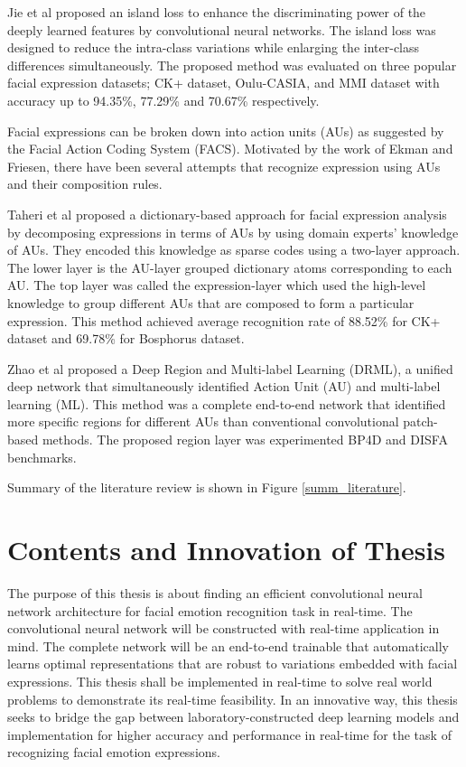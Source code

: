 \documentclass[master]{thesis-uestc}
\begin{document}
Jie et al\cite{8373844} proposed an island loss to enhance the discriminating power of the deeply learned features by convolutional neural networks. The island loss was designed to reduce the intra-class variations while enlarging the inter-class differences simultaneously. The proposed method was evaluated on three popular facial expression datasets; CK+ dataset, Oulu-CASIA, and MMI dataset with accuracy up to 94.35\%, 77.29\% and 70.67\% respectively.

Facial expressions can be broken down into action units (AUs) as suggested by the Facial Action Coding System (FACS). Motivated by the work of Ekman and Friesen\cite{ekman}, there have been several attempts that recognize expression using AUs and their composition rules.

Taheri et al\cite{6837526} proposed a dictionary-based approach for facial expression analysis by decomposing expressions in terms of AUs by using domain experts’ knowledge of AUs. They encoded this knowledge as sparse codes using a two-layer approach. The lower layer is the AU-layer grouped dictionary atoms corresponding to each AU. The top layer was called the expression-layer which used the high-level knowledge to group different AUs that are composed to form a particular expression. This method achieved average recognition rate of 88.52\% for CK+ dataset and 69.78\% for Bosphorus dataset\cite{10.1007/978-3-540-89991-4_6}.

Zhao et al\cite{7780738} proposed a Deep Region and Multi-label Learning (DRML), a unified deep network that simultaneously identified Action Unit (AU) and multi-label learning (ML). This method was a complete end-to-end network that identified more specific regions for different AUs than conventional convolutional patch-based methods. The proposed region layer was experimented BP4D \cite{6553788} and DISFA\cite{10.1007/978-3-642-33783-3_58} benchmarks.

Summary of the literature review is shown in Figure \ref{summ_literature}.

\section{Contents and Innovation of Thesis}
The purpose of this thesis is about finding an efficient convolutional neural network architecture for facial emotion recognition task in real-time. The convolutional neural network will be constructed with real-time application in mind. The complete network will be an end-to-end trainable that automatically learns optimal representations that are robust to variations embedded with facial expressions. This thesis shall be implemented in real-time to solve real world problems to demonstrate its real-time feasibility. In an innovative way, this thesis seeks to bridge the gap between laboratory-constructed deep learning models and implementation for higher accuracy and performance in real-time for the task of recognizing facial emotion expressions.
\end{document}
